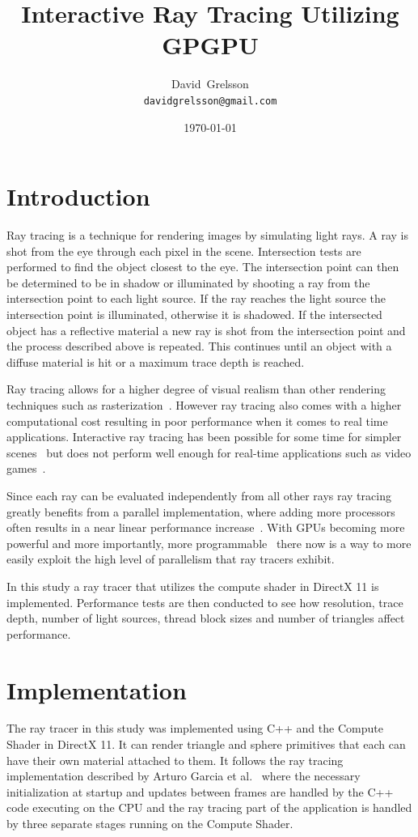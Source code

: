 \documentclass{article}
\author{David~Grelsson \\ \texttt{davidgrelsson@gmail.com}}
\date{\today}
\title{Interactive Ray Tracing Utilizing GPGPU}
\begin{document}
\maketitle


\section{Introduction}
\label{sec:Introduction}
Ray tracing is a technique for rendering images by simulating light rays. A ray is shot from the eye through each pixel
in the scene. Intersection tests are performed to find the object closest to the eye. The intersection point can then
be determined to be in shadow or illuminated by shooting a ray from the intersection point to each light source. If the
ray reaches the light source the intersection point is illuminated, otherwise it is shadowed. If the intersected object
has a reflective material a new ray is shot from the intersection point and the process described above is repeated.
This continues until an object with a diffuse material is hit or a maximum trace depth is reached.

Ray tracing allows for a higher degree of visual realism than other rendering techniques such as 
rasterization~\cite{GPUPro3RayTracer}. However ray tracing also comes with a higher computational cost resulting in poor 
performance when it comes to real time applications. Interactive ray tracing has been possible for some time for simpler
scenes~\cite{RealTimeRendering} but does not perform well enough for real-time applications such as video games~\cite{Friedrich:2006}.

Since each ray can be evaluated independently from all other rays ray tracing greatly benefits from a parallel implementation,
where adding more processors often results in a near linear performance increase~\cite{RealTimeRendering}. With GPUs becoming
more powerful and more importantly, more programmable~\cite{MassivelyParallelProcessors} there now is a way to more easily exploit
the high level of parallelism that ray tracers exhibit.

In this study a ray tracer that utilizes the compute shader in DirectX 11 is implemented. Performance tests are then conducted
to see how resolution, trace depth, number of light sources, thread block sizes and number of triangles affect performance.



\section{Implementation}
\label{sec:Implementation}
The ray tracer in this study was implemented using C++ and the Compute Shader in DirectX 11. It can render triangle and sphere
primitives that each can have their own material attached to them. It follows the ray tracing implementation described by
Arturo Garcia et al.~\cite{GPUPro3RayTracer} where the necessary initialization at startup and updates between frames are
handled by the C++ code executing on the CPU and the ray tracing part of the application is handled by three separate
stages running on the Compute Shader.
\end{document}
